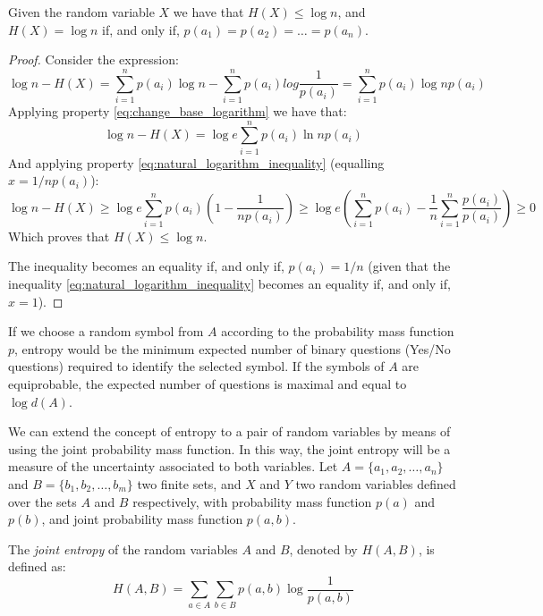 \begin{proposition}
\label{prop:maximum_entropy}
Given the random variable $X$ we have that $H(X) \leq \log n$, and $H(X) = \log n$ if, and only if, $p(a_1) = p(a_2) = \ldots = p(a_n)$.
\end{proposition}
\begin{proof}
Consider the expression:
\[
\log n - H(X) = \sum_{i=1}^n p(a_i) \log n - \sum_{i=1}^n p(a_i) log {\frac{1}{p(a_i)}} = \sum_{i=1}^n p(a_i) \log n p(a_i)
\]
Applying property \ref{eq:change_base_logarithm} we have that:
\[
\log n - H(X) = \log e \sum_{i=1}^n p(a_i) \ln n p(a_i)
\]
And applying property \ref{eq:natural_logarithm_inequality} (equalling $x = 1 / n p(a_i)$):
\[
\log n - H(X) \geq \log e \sum_{i=1}^n p(a_i) \left( 1 - \frac{1}{n p(a_i)} \right) \geq \log e \left( \sum_{i=1}^n p(a_i) - \frac{1}{n} \sum_{i=1}^n \frac{p(a_i)}{p(a_i)} \right) \geq 0
\]
Which proves that $H(X) \leq \log n$.

The inequality becomes an equality if, and only if, $p(a_i) = 1 / n$ (given that the inequality \ref{eq:natural_logarithm_inequality} becomes an equality if, and only if, $x=1$).

\end{proof}

\begin{example}
If we choose a random symbol from $A$ according to the probability mass function $p$, entropy would be the minimum expected number of binary questions (Yes/No questions) required to identify the selected symbol. If the symbols of $A$ are equiprobable, the expected number of questions is maximal and equal to $\log d(A)$.
\end{example}

We can extend the concept of entropy to a pair of random variables by means of using the joint probability mass function. In this way, the joint entropy will be a measure of the uncertainty associated to both variables. Let $A = \{a_1, a_2, \ldots, a_n\}$ and $B = \{b_1, b_2, \dots, b_m\}$ two finite sets, and $X$ and $Y$ two random variables defined over the sets $A$ and $B$ respectively, with probability mass function $p(a)$ and $p(b)$, and joint probability mass function $p(a, b)$.

\begin{definition}
The \emph{joint entropy} of the random variables $A$ and $B$, denoted by $H(A, B)$, is defined as:
\[
H(A, B) = \sum_{a \in A} \sum_{b \in B} p(a, b) \log \frac{1}{p(a, b)}
\]
\end{definition}

